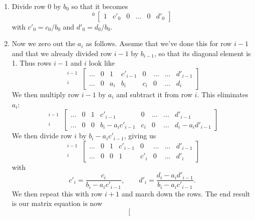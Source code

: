 \begin{enumerate}
\item Divide row 0 by $b_{0}$ so that it becomes
\[
{}^{0}\,\left[\begin{array}{ccccc|c}
  1 & c'_{0} & 0& \ldots & 0 & d'_{0} \end{array}\right]
\]
with $c'_{0} = c_{0}/b_{0}$ and $d'_{0} = d_{0}/b_{0}$.
\item Now we zero out the $a_{i}$ as follows. Assume that we've done this for row $i-1$ and that we already divided row $i-1$ by $b_{i-1}$, so that its diagonal element is 1. Thus rows $i-1$ and $i$ look like
\[
\begin{array}{r} {}^{i-1}\\ {}^{i}\end{array}\,
\left[\begin{array}{ccccccc|c}
	 \ldots & 0 & 1     & c'_{i-1} & 0     & \ldots & \ldots & d'_{i-1}\\
	 \ldots & 0 & a_{i} & b_{i}    & c_{i} & 0      & \ldots & d_{i}
\end{array}\right]
\]
We then multiply row $i-1$ by $a_{i}$ and subtract it from row $i$. This eliminates $a_{i}$:
\[
\begin{array}{r} {}^{i-1}\\ {}^{i}\end{array}\,
\left[\begin{array}{ccccccc|c}
	 \ldots & 0 & 1 & c'_{i-1}            & 0     & \ldots & \ldots & d'_{i-1}\\
	 \ldots & 0 & 0 & b_{i}-a_{i}c'_{i-1} & c_{i} & 0      & \ldots & d_{i}-a_{i}d'_{i-1}
\end{array}\right]
\]
We then divide row $i$ by $b_{i}-a_{i}c'_{i-1}$, giving us
\[
\begin{array}{r} {}^{i-1}\\ {}^{i}\end{array}\,
\left[\begin{array}{ccccccc|c}
	 \ldots & 0 & 1 & c'_{i-1} & 0      & \ldots & \ldots & d'_{i-1}\\
	 \ldots & 0 & 0 & 1        & c'_{i} & 0      & \ldots & d'_{i}
\end{array}\right]
\]
with
\[ c'_{i} = \frac{c_{i}}{b_{i}-a_{i}c'_{i-1}},\qquad d'_{i} = \frac{d_{i}-a_{i}d'_{i-1}}{b_{i}-a_{i}c'_{i-1}}.
\]
We then repeat this with row $i+1$ and march down the rows. The end result is our matrix equation is now
\[
\left[\begin{array}{ccccccccccc}

\end{array}\]
\end{enumerate}

